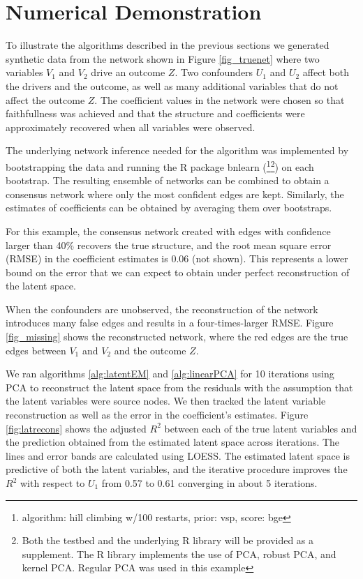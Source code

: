 \documentclass{article}
\begin{document}
\section{Numerical Demonstration}
To illustrate  the algorithms described in the previous sections we
generated synthetic data from the network shown in Figure
\ref{fig_truenet} where two variables $V_1$ and $V_2$ drive an outcome
$Z$. Two confounders $U_1$ and $U_2$ affect both the drivers and the
outcome, as well as many additional variables that do not affect the
outcome $Z$.
The coefficient values in the network were chosen
so that faithfullness was achieved and that the structure
and coefficients were approximately recovered when all variables were observed.

The underlying network inference needed for the algorithm was
implemented by bootstrapping the data  and running
the R package bnlearn (\cite{scutari_learning_2010}\footnote{algorithm: hill climbing w/100 restarts, prior: vsp, score: bge}\footnote{Both the testbed and the underlying R library will be provided as a supplement.  The R library implements the use of PCA, robust PCA, and kernel PCA.  Regular PCA was used in this example}) on each bootstrap.  The resulting ensemble of networks can be combined to obtain a consensus network where only the most confident edges are kept. Similarly, the estimates of coefficients can be obtained by averaging them over bootstraps.

For this example, the consensus network created with edges with confidence larger than 40\%
recovers the true structure, and the root mean square error (RMSE) in the
coefficient estimates is 0.06 (not shown). This represents a lower
bound on the error that we can expect to obtain under perfect
reconstruction of the latent space.

When the confounders are unobserved, the reconstruction of the network
introduces many false edges and results in a four-times-larger RMSE. Figure \ref{fig_missing} shows the reconstructed network, where the red edges are the true edges between $V_1$ and $V_2$
and the outcome $Z$.

We ran algorithms \ref{alg:latentEM} and \ref{alg:linearPCA} for 10
iterations using PCA to reconstruct the latent space from the
residuals with the assumption that the latent variables were source nodes. We then tracked the latent variable reconstruction as well as the error in the coefficient's estimates. Figure \ref{fig:latrecons} shows the adjusted $R^2$ between each of the true latent variables and the prediction obtained
from the estimated latent space across iterations. The lines and error bands are calculated using LOESS. The estimated latent space is predictive of both
the latent variables, and the iterative procedure improves the $R^2$ with
respect to $U_1$ from 0.57 to 0.61 converging in about 5 iterations.
\end{document}
